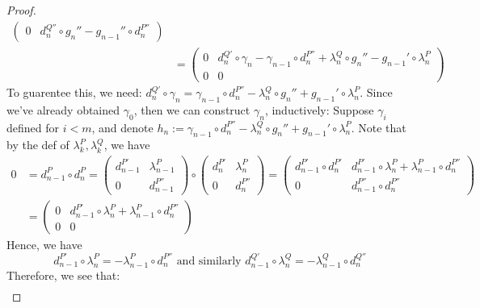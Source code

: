 \begin{proof}
\begin{align*}
\begin{pmatrix}
            0 &d_n^{Q''} \circ g_n''- g_{n-1}''\circ d_n^{P''}
        \end{pmatrix}
        \\
        &=\begin{pmatrix}
            0&d_n^{Q'} \circ \gamma_n- \gamma_{n-1} \circ d_n^{P''}+ \lambda_n^Q\circ g_n''- g_{n-1}' \circ \lambda_n^P\\
            0&0
        \end{pmatrix}
    \end{align*}
    To guarentee this, we need: $d_n^{Q'} \circ \gamma_n= \gamma_{n-1} \circ d_n^{P''}- \lambda_n^Q\circ g_n''+ g_{n-1}' \circ \lambda_n^P$. Since we've already obtained $\gamma_0$, then we can construct $\gamma_n$, inductively: Suppose $\gamma_i$ defined for $i<m$, and denote $h_n:= \gamma_{n-1} \circ d_n^{P''}- \lambda_n^Q\circ g_n''+ g_{n-1}' \circ \lambda_n^P$. Note that by the def of $\lambda_k^P,\lambda_k^Q$, we have
    \begin{align*}
        0&= d_{n-1}^P \circ d_n^P= \begin{pmatrix}
            d_{n-1}^{P'} &\lambda_{n-1}^P\\
            0&d_{n-1}^{P''}
        \end{pmatrix}
        \circ \begin{pmatrix}
            d_n^{P'} &\lambda_n^P\\
            0&d_n^{P''}
        \end{pmatrix}
        =\begin{pmatrix}
            d_{n-1}^{P'} \circ d_n^{P'} &d_{n-1}^{P'} \circ \lambda_n^{P} +\lambda_{n-1}^P \circ d_n^{P''}\\
            0& d_{n-1}^{P''} \circ d_n^{P''}
        \end{pmatrix}
        \\
        &=\begin{pmatrix}
            0&d_{n-1}^{P'} \circ \lambda_n^{P} +\lambda_{n-1}^P \circ d_n^{P''}\\
            0&0
        \end{pmatrix}
    \end{align*}
    Hence, we have
    \begin{equation*}
        d_{n-1}^{P'} \circ \lambda_n^P= -\lambda_{n-1}^{P} \circ d_n^{P''} \text{ and similarly } d_{n-1}^{Q'} \circ \lambda_n^Q=- \lambda_{n-1}^Q \circ d_n^{Q''} \tag{*}
    \end{equation*}
    Therefore, we see that:
    \begin{align*}

\end{align*}
\end{proof}
